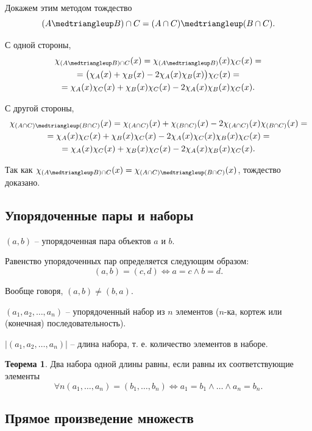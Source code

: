 \documentclass[a5paper, 11pt]{extarticle}
\theoremstyle{definition}
\newtheorem*{theorem*}{Теорема}
\theoremstyle{definition}
\theoremstyle{definition}
\numberwithin{figure}{section}
\numberwithin{table}{section}
\newcommand{\symdiff}{\medtriangleup}
\begin{document}
Докажем этим методом тождество
\[
    (A \symdiff B) \cap C = (A \cap C) \symdiff (B \cap C).
\]

С одной стороны,
\begin{gather*}
    \chi_{(A \symdiff B) \cap C}(x) =
    \chi_{(A \symdiff B)}(x) \chi_C(x) = \\ =
    \big(\chi_A(x) + \chi_B(x) - 2 \chi_A(x) \chi_B(x)\big) \chi_C(x) = \\ =
    \chi_A(x) \chi_C(x) + \chi_B(x) \chi_C(x) - 2 \chi_A(x) \chi_B(x) \chi_C(x).
\end{gather*}

С другой стороны,
\begin{gather*}
    \chi_{(A \cap C) \symdiff (B \cap C)}(x) =
    \chi_{(A \cap C)}(x) + \chi_{(B \cap C)}(x) - 2 \chi_{(A \cap C)}(x) \chi_{(B \cap C)}(x) = \\ =
    \chi_A(x) \chi_C(x) + \chi_B(x) \chi_C(x) - 2 \chi_A(x) \chi_C(x) \chi_B(x) \chi_C(x) = \\ =
    \chi_A(x) \chi_C(x) + \chi_B(x) \chi_C(x) - 2 \chi_A(x) \chi_B(x) \chi_C(x).
\end{gather*}

Так как \(\chi_{(A \symdiff B) \cap C}(x) = \chi_{(A \cap C) \symdiff (B \cap C)}(x)\), тождество доказано.

\subsection{Упорядоченные пары и наборы}

\((a, b)\) -- упорядоченная пара объектов \(a\) и \(b\).

Равенство упорядоченных пар определяется следующим образом:
\[
    (a, b) = (c, d) \iff a = c \land b = d.
\]

Вообще говоря, \((a, b) \neq (b, a)\).

\((a_1, a_2, \ldots, a_n)\) -- упорядоченный набор из \(n\) элементов (\(n\)-ка, кортеж или (конечная) последовательность).

\(|(a_1, a_2, \ldots, a_n)|\) -- длина набора, т. е. количество элементов в наборе.

\begin{theorem*}
    Два набора одной длины равны, если равны их соответствующие элементы
    \[
        \forall n (a_1, \ldots, a_n) = (b_1, \ldots, b_n) \iff a_1 = b_1 \land \ldots \land a_n = b_n.
    \]
\end{theorem*}

\subsection{Прямое произведение множеств}
\end{document}
